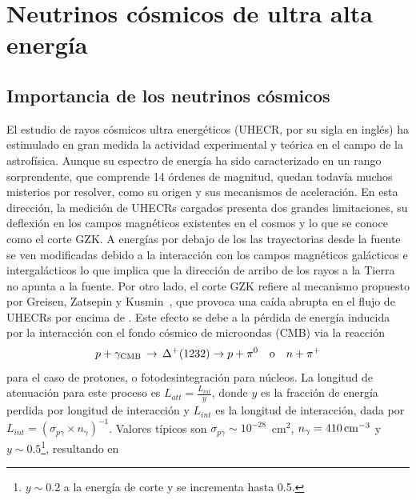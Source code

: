 \chapter{Neutrinos c\'osmicos de ultra alta energ\'ia}
\label{ch:NeutrinosUHE}

%
%
%
%
\section{Importancia de los neutrinos cósmicos}


El estudio de rayos c\'osmicos ultra energ\'eticos (UHECR, por su sigla en ingl\'es) ha estimulado en gran medida la actividad experimental y te\'orica en el campo de la astrof\'isica.
Aunque su espectro de energ\'ia ha sido caracterizado en un rango sorprendente, que comprende 14 \'ordenes de magnitud, quedan todav\'ia muchos misterios por resolver, como su origen y sus mecanismos de aceleraci\'on.
En esta direcci\'on, la medici\'on de UHECRs cargados presenta dos grandes limitaciones, su deflexi\'on en los campos magn\'eticos existentes en el cosmos y lo que se conoce como el corte GZK.
A energ\'ias por debajo de los  las trayectorias desde la fuente se ven modificadas debido a la interacci\'on con los campos magn\'eticos gal\'acticos e intergal\'acticos lo que implica que la direcci\'on de arribo de los rayos a la Tierra no apunta a la fuente.
Por otro lado, el corte GZK refiere al mecanismo propuesto por Greisen, Zatsepin y Kusmin~\cite{cite:Greisen,cite:Zatsepin}, que provoca una caída abrupta en el flujo de UHECRs por encima de .
Este efecto se debe a la p\'erdida de energ\'ia inducida por la interacci\'on con el fondo c\'osmico de microondas (CMB) via la reacci\'on
%
\begin{equation}
p + \gamma_{\rm CMB}\, \rightarrow\, \Delta^{+}(1232)  \rightarrow p +\pi^{0}\quad {\rm o}\quad n +\pi^{+}
\end{equation}
%
para el caso de protones, o fotodesintegración para núcleos.
La longitud de atenuaci\'on para este proceso es $L_{att}=\frac{L_{int}}{y}$, donde $y$ es la fracci\'on de energ\'ia perdida por longitud de interacci\'on y $L_{int}$ es la longitud de interacci\'on, dada por $L_{int}=(\sigma_{p\gamma}\times n_{\gamma})^{-1}$.
Valores t\'ipicos son $\sigma_{p\gamma}\sim 10^{-28}$~cm$^{2}$, $ n_{\gamma}=410\,{\rm cm}^{-3}$ y $y\sim0.5$\footnote{$y\sim0.2$ a la energ\'ia de corte y se incrementa hasta 0.5.}, resultando en 
